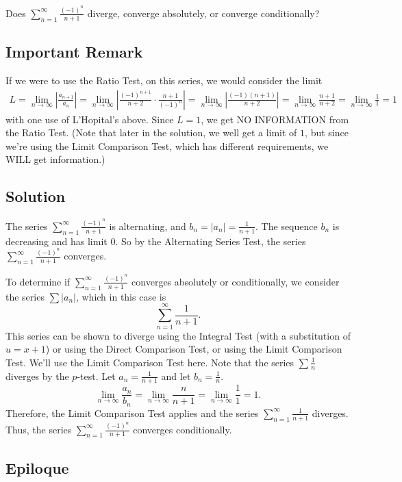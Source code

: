 \documentclass{article}
\begin{document}
\noindent
Does $\displaystyle \sum_{n=1}^\infty \frac{(-1)^n}{n+1}$
diverge, converge absolutely, or converge conditionally?

\subsection*{Important Remark}

{\color{red}If we were to use the Ratio Test, on this series, we would consider the limit
\begin{align*}
L=\lim_{n \to \infty} \left|\frac{a_{n+1}}{a_n}\right|
= \lim_{n \to \infty} \left| \frac{(-1)^{n+1}}{n+2} \cdot \frac{n+1}{(-1)^n}\right|
= \lim_{n \to \infty} \left| \frac{(-1)(n+1)}{n+2}\right|
= \lim_{n \to \infty} \frac{n+1}{n+2}
= \lim_{n \to \infty} \frac{1}{1} 
= 1
\end{align*}
with one use of L'Hopital's above. Since $L=1$, we get NO INFORMATION from the Ratio Test. (Note that later in the solution, we well get a limit of $1$, but since we're using the Limit Comparison Test, which has different requirements, we WILL get information.)}

\subsection*{Solution}

The series $\displaystyle \sum_{n=1}^\infty \frac{(-1)^n}{n+1}$ is alternating, and $b_n = |a_n| = \frac1{n+1}$. The sequence $b_n$ is decreasing and has limit $0$. So by the Alternating Series Test, the series $\displaystyle \sum_{n=1}^\infty \frac{(-1)^n}{n+1}$ converges.

To determine if $\displaystyle \sum_{n=1}^\infty \frac{(-1)^n}{n+1}$ converges absolutely or conditionally, we consider the series $\sum |a_n|$, which in this case is
\[\sum_{n=1}^\infty \frac{1}{n+1}.\]
This series can be shown to diverge using the Integral Test (with a substitution of $u=x+1$) or using the Direct Comparison Test, or using the Limit Comparison Test. We'll use the Limit Comparison Test here. Note that the series $\sum \frac1n$ diverges by the $p$-test. Let $a_n = \frac1{n+1}$ and let $b_n = \frac1n$.
\[ \lim_{n \to \infty} \frac{a_n}{b_n} = \lim_{n \to \infty} \frac{n}{n+1} = \lim_{n \to \infty} \frac11 = 1.\]
Therefore, the Limit Comparison Test applies and the series $\sum_{n=1}^\infty \frac{1}{n+1}$ diverges. Thus, the series  $\displaystyle \sum_{n=1}^\infty \frac{(-1)^n}{n+1}$  converges conditionally.

\subsection*{Epiloque}
\end{document}

